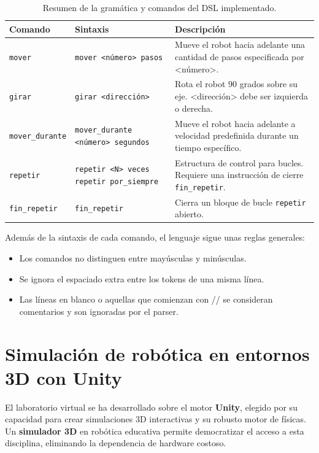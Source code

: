 \begin{table}[h!]
	\centering
	\begin{tabular}{|l|l|p{4cm}|}
		\hline
		\textbf{Comando} & \textbf{Sintaxis} & \textbf{Descripción} \\
		\hline
		\texttt{mover} & \texttt{mover <número> pasos} & Mueve el robot hacia adelante una cantidad de pasos especificada por <número>. \\
		\hline
		\texttt{girar} & \texttt{girar <dirección>} & Rota el robot 90 grados sobre su eje. <dirección> debe ser izquierda o derecha. \\
		\hline
		\texttt{mover\_durante} & \texttt{mover\_durante <número> segundos} & Mueve el robot hacia adelante a velocidad predefinida durante un tiempo específico. \\
		\hline
		\texttt{repetir} & \texttt{repetir <N> veces} \newline \texttt{ repetir por\_siempre} & Estructura de control para bucles. Requiere una instrucción de cierre \texttt{fin\_repetir}. \\
		\hline
		\texttt{fin\_repetir} & \texttt{fin\_repetir} & Cierra un bloque de bucle \texttt{repetir} abierto. \\
		\hline
	\end{tabular}
	\caption{Resumen de la gramática y comandos del DSL implementado.}
	\label{tab:gramatica_dsl}
\end{table}

Además de la sintaxis de cada comando, el lenguaje sigue unas reglas generales:
\begin{itemize}
	\item Los comandos no distinguen entre mayúsculas y minúsculas.
	\item Se ignora el espaciado extra entre los tokens de una misma línea.
	\item Las líneas en blanco o aquellas que comienzan con // se consideran comentarios y son ignoradas por el parser.
\end{itemize}


\section{Simulación de robótica en entornos 3D con Unity}
El laboratorio virtual se ha desarrollado sobre el motor \textbf{Unity}, elegido por su capacidad para crear simulaciones 3D interactivas y su robusto motor de físicas. Un \textbf{simulador 3D} en robótica educativa permite democratizar el acceso a esta disciplina, eliminando la dependencia de hardware costoso.

